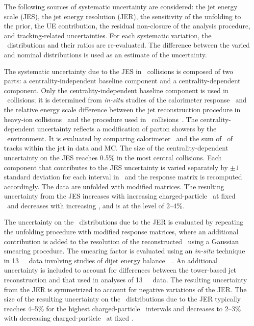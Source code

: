 
The following sources of systematic uncertainty are considered:
the jet energy scale (JES), the jet energy resolution (JER), 
the sensitivity of the  unfolding to the prior, the UE contribution, the residual non-closure of the analysis procedure, and tracking-related uncertainties.
For each systematic variation, the \Dptr\ distributions and their ratios are re-evaluated. The difference between the varied and nominal distributions is used as an estimate of the uncertainty.

The systematic uncertainty due to the JES in \PbPb\ collisions is composed of two parts: 
a centrality-independent baseline component and a centrality-dependent component. Only the centrality-independent baseline component is used in \pp\ collisions; 
it is determined from \textit{in-situ} studies of the calorimeter
response~\cite{Aad:2011he,HIjesnote,Run2jetpubnote} and the relative energy scale difference between the jet reconstruction procedure in heavy-ion collisions~\cite{HIjesnote} and the procedure used in \pp\ collisions~\cite{Aad:2014bia}. The centrality-dependent uncertainty reflects a modification of parton showers by the \PbPb\ environment. It is evaluated by comparing calorimeter \ptjet\ and the sum of \pt\ of tracks within the jet in data and MC. The size of the centrality-dependent uncertainty on the JES reaches 0.5\% in the most central collisions. Each component that contributes to the JES uncertainty is varied separately by $\pm1$ standard deviation for each interval in \ptjet\ and the response matrix is recomputed accordingly. The data are unfolded with modified matrices. The resulting uncertainty from the JES increases with increasing charged-particle \pT\ at fixed \ptjet\ and decreases with increasing \ptjet, and is at the level of 2--4\%.

The uncertainty on the \Dptr\ distributions due to the JER is evaluated by repeating the unfolding procedure with modified response matrices, where an additional contribution is added to the resolution of the reconstructed \ptjet\ using a Gaussian smearing procedure. The smearing factor is evaluated using an \textit{in-situ} technique in 13~\TeV\ \pp\ data involving studies of dijet energy balance~~\cite{Aad:2012ag,JERConfNote}. An additional uncertainty is included to account for differences between the tower-based jet reconstruction and that used in analyses of 13~\TeV\ \pp\ data. The resulting uncertainty from the JER is symmetrized to account for negative variations of the JER.  The size of the resulting uncertainty on the \Dptr\ distributions due to the JER typically reaches 4--5\% for the highest charged-particle \pT\ intervals and decreases to 2--3\% with decreasing charged-particle \pT\ at fixed \ptjet.

